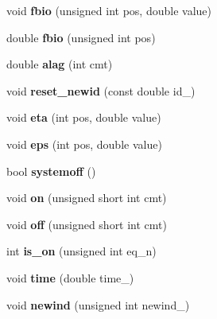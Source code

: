 \begin{DoxyCompactItemize}
void {\bfseries fbio} (unsigned int pos, double value)
\item 
\mbox{\label{classodeproblem_abe453ef912e890b1f6e1fea51e627a5e}} 
double {\bfseries fbio} (unsigned int pos)
\item 
\mbox{\label{classodeproblem_a486c40b4b6746afe3aa079cb7bb5c7dc}} 
double {\bfseries alag} (int cmt)
\item 
\mbox{\label{classodeproblem_ae210665b2d2c52c802aa2d95304ba111}} 
void {\bfseries reset\+\_\+newid} (const double id\+\_\+)
\item 
\mbox{\label{classodeproblem_a54f096ed754117bfe2c1a58d6661c69c}} 
void {\bfseries eta} (int pos, double value)
\item 
\mbox{\label{classodeproblem_a21f796445e785d46939ac4c50e719c37}} 
void {\bfseries eps} (int pos, double value)
\item 
\mbox{\label{classodeproblem_ab23130b9de7b9b8af0f72a01d1168a87}} 
bool {\bfseries systemoff} ()
\item 
\mbox{\label{classodeproblem_a2b6729af8ce989fe14c54657ae7c59f1}} 
void {\bfseries on} (unsigned short int cmt)
\item 
\mbox{\label{classodeproblem_a0f76cc6a34e82e34edc6c68c390bddae}} 
void {\bfseries off} (unsigned short int cmt)
\item 
\mbox{\label{classodeproblem_afa433b145c17640cbcf31e6a72e009f6}} 
int {\bfseries is\+\_\+on} (unsigned int eq\+\_\+n)
\item 
\mbox{\label{classodeproblem_a570f475a1f81d2128fa90b9551ec9c37}} 
void {\bfseries time} (double time\+\_\+)
\item 
\mbox{\label{classodeproblem_a370c76cd4b8ae3ebd2d9ce3b1dd6a013}} 
void {\bfseries newind} (unsigned int newind\+\_\+)
\item 
\mbox{\label{classodeproblem_a352d6631fea50cfe328011c6c337e8d7}} 

\end{DoxyCompactItemize}
